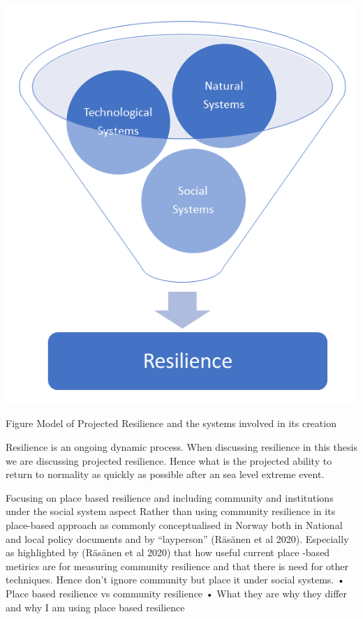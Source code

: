 \documentclass{article}
\begin{document}
\includegraphics[width=1\textwidth]{fig_theory/resilience model .png}

\begin{frame}{Figure Model of Projected Resilience and the systems involved in its creation }
\end{frame}

Resilience is an ongoing dynamic process. When discussing resilience in this thesis we are discussing projected resilience. Hence what is the projected ability to return to normality as quickly as possible after an sea level extreme event. 
 
Focusing on place based resilience and including community and institutions under the social system aspect
Rather than using community resilience in its place-based approach as commonly conceptualised in Norway both in National and local policy documents and by “layperson” (Räsänen et al 2020). Especially as highlighted by (Räsänen et al 2020) that how useful current place -based metirics are for measuring community resilience and that there is need for other techniques. Hence don’t ignore community but place it under social systems. 
•	Place based resilience vs community resilience
•	What they are why they differ and why I am using place based resilience
\end{document}
